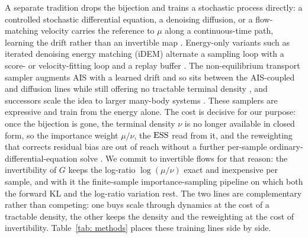 \documentclass{article}
\begin{document}
A separate tradition drops the bijection and trains a stochastic process directly: a controlled stochastic differential equation, a denoising diffusion, or a flow-matching velocity carries the reference to $\mu$ along a continuous-time path, learning the drift rather than an invertible map \citep{zhang2022path,vargas2023denoising,berner2024optimal,nusken2021solving,richter2024improved}. Energy-only variants such as iterated denoising energy matching (iDEM) alternate a sampling loop with a score- or velocity-fitting loop and a replay buffer \citep{akhound2024iterated,woo2024iefm}. The non-equilibrium transport sampler augments AIS with a learned drift and so sits between the AIS-coupled and diffusion lines while still offering no tractable terminal density \citep{albergo2024nets}, and successors scale the idea to larger many-body systems \citep{havens2025adjoint,akhoundsadegh2025progressive}. These samplers are expressive and train from the energy alone. The cost is decisive for our purpose: once the bijection is gone, the terminal density $\nu$ is no longer available in closed form, so the importance weight $\mu/\nu$, the $\mathrm{ESS}$ read from it, and the reweighting that corrects residual bias are out of reach without a further per-sample ordinary-differential-equation solve \citep{he2025notrick}. We commit to invertible flows for that reason: the invertibility of $G$ keeps the log-ratio $\log(\mu/\nu)$ exact and inexpensive per sample, and with it the finite-sample importance-sampling pipeline on which both the forward KL and the log-ratio variation rest. The two lines are complementary rather than competing: one buys scale through dynamics at the cost of a tractable density, the other keeps the density and the reweighting at the cost of invertibility. Table~\ref{tab: methods} places these training lines side by side.
\end{document}
